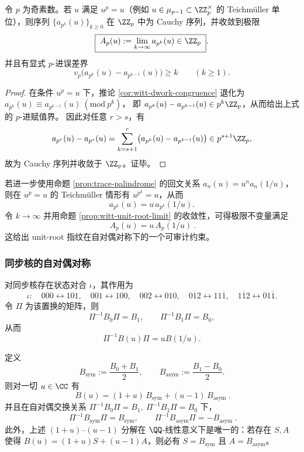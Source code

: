 \begin{proposition}[unit-root 极限不变量：\texorpdfstring{$u^p=u$}{u^p=u} 时 \texorpdfstring{$a_{p^k}(u)$}{a_{p^k}(u)} 在 \texorpdfstring{$\ZZ_p$}{Z_p} 中收敛]\label{prop:witt-unit-root-limit}
令 \(p\) 为奇素数。若 \(u\) 满足 \(u^p=u\)（例如 \(u\in\mu_{p-1}\subset\ZZ_p^\times\) 的 Teichm\"uller 单位），则序列 \(\{a_{p^k}(u)\}_{k\ge 0}\) 在 \(\ZZ_p\) 中为 Cauchy 序列，并收敛到极限
\[
\boxed{\;
A_p(u):=\lim_{k\to\infty}a_{p^k}(u)\in \ZZ_p\; }.
\]
并且有显式 \(p\)-进误差界
\[
v_p\!\bigl(a_{p^k}(u)-a_{p^{k-1}}(u)\bigr)\ge k\qquad(k\ge 1).
\]
\end{proposition}
\begin{proof}
在条件 \(u^p=u\) 下，推论 \ref{cor:witt-dwork-congruence} 退化为
\(
a_{p^k}(u)\equiv a_{p^{k-1}}(u)\ (\mathrm{mod}\ p^k)
\)，
即 \(a_{p^k}(u)-a_{p^{k-1}}(u)\in p^k\ZZ_p\)，从而给出上式的 \(p\)-进赋值界。
因此对任意 \(r>s\)，有
\[
a_{p^r}(u)-a_{p^s}(u)=\sum_{k=s+1}^{r}\bigl(a_{p^k}(u)-a_{p^{k-1}}(u)\bigr)\in p^{s+1}\ZZ_p,
\]
故为 Cauchy 序列并收敛于 \(\ZZ_p\)。证毕。
\end{proof}

\begin{remark}\label{rem:witt-unit-root-self-dual}
若进一步使用命题 \ref{prop:trace-palindrome} 的回文关系 \(a_n(u)=u^n a_n(1/u)\)，则在 \(u^p=u\) 的 Teichm\"uller 情形有 \(u^{p^k}=u\)，从而
\[
a_{p^k}(u)=u\,a_{p^k}(1/u).
\]
令 \(k\to\infty\) 并用命题 \ref{prop:witt-unit-root-limit} 的收敛性，可得极限不变量满足
\[
\boxed{\ A_p(u)=u\,A_p(1/u)\ }.
\]
这给出 unit-root 指纹在自对偶对称下的一个可审计约束。
\end{remark}

\subsubsection{同步核的自对偶对称}\label{app:kernel-self-dual}
对同步核存在状态对合 $\iota$，其作用为
\[
\iota:\quad
000\leftrightarrow 101,\quad
001\leftrightarrow 100,\quad
002\leftrightarrow 010,\quad
0\overline{1}2\leftrightarrow 11\overline{1},\quad
1\overline{1}2\leftrightarrow 01\overline{1}.
\]
令 $\Pi$ 为该置换的矩阵，则
\[
\Pi^{-1}B_0\Pi=B_1,\qquad \Pi^{-1}B_1\Pi=B_0,
\]
从而
\[
\Pi^{-1}B(u)\Pi=uB(1/u).
\]
\begin{lemma}\label{lem:sync-kernel-even-odd-splitting}
定义
\[
B_{\mathrm{sym}}:=\frac{B_0+B_1}{2},\qquad
B_{\mathrm{asym}}:=\frac{B_1-B_0}{2}.
\]
则对一切 \(u\in\CC\) 有
\[
\boxed{\ B(u)=(1+u)\,B_{\mathrm{sym}}+(u-1)\,B_{\mathrm{asym}}\ }.
\]
并且在自对偶交换关系 \(\Pi^{-1}B_0\Pi=B_1,\ \Pi^{-1}B_1\Pi=B_0\) 下，
\[
\boxed{\ \Pi^{-1}B_{\mathrm{sym}}\Pi=B_{\mathrm{sym}},\qquad
\Pi^{-1}B_{\mathrm{asym}}\Pi=-B_{\mathrm{asym}}\ }.
\]
此外，上述 \((1+u)\)--\((u-1)\) 分解在 \(\QQ\)-线性意义下是唯一的：若存在 \(S,A\) 使得
\(
B(u)=(1+u)S+(u-1)A
\)，则必有 \(S=B_{\mathrm{sym}}\) 且 \(A=B_{\mathrm{asym}}\)。
\end{lemma}

